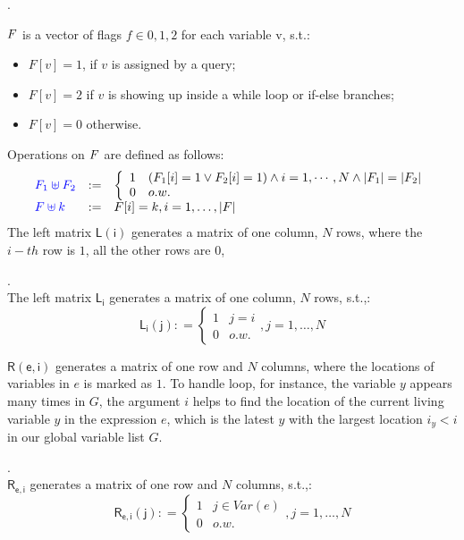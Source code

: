 \documentclass[a4paper,11pt]{article}
\begin{document}
\begin{defn}.
\\
{
$F$ is a vector of flags $f \in {0, 1, 2}$ for each variable v, s.t.:
\begin{itemize}
\item $F[v] = 1$, if $v$ is assigned by a query; 
\item $F[v] = 2$ if $v$ is showing up inside a while loop or if-else branches;
\item $F[v] = 0$ otherwise.
\end{itemize}
} 
\end{defn}
%
Operations on $F$ are defined as follows:
\[
\begin{array}{lll}
\jl{\flag_1 \uplus \flag_2} & := &
\left\{
\begin{array}{ll}
1 & (\flag_1[i] = 1 \lor \flag_2[i] = 1) \land i = 1, \cdots, N \land |\flag_1| = |\flag_2|\\
0 & o.w.
\end{array}\right.
\\
\jl{\flag \uplus k} & := & \flag[i] = k , i = 1, \ldots, |\flag|    \\
\end{array}
\]
The left matrix $\mathsf{L(i)}$ generates a matrix of one column, $N$ rows, where the $i-th$ row is $1$, all the other rows are $0$,
\begin{defn}.
\\
The left matrix $\mathsf{L_i}$ generates a matrix of one column, $N$ rows, s.t.,:
\[
	\mathsf{L_i(j)} : = 
	\left\{
	\begin{array}{ll}
	1 & j = i \\
	0 & o.w.
	\end{array}
	\right., j = 1, \ldots, N
\]
\end{defn}

$\mathsf{R(e, i)}$ generates a matrix of one row and $N$ columns, where the locations of variables in $e$ is marked as $1$. To handle loop, for instance, the variable $y$ appears many times in $G$, the argument $i$ helps to find the location of the current living variable $y$ in the expression $e$, which is the latest $y$ with the largest location $i_y< i$ in our global variable list $G$.
\begin{defn}.
\\
$\mathsf{R_{e, i}}$ generates a matrix of one row and $N$ columns, s.t.,:
\[
	\mathsf{R_{e, i}(j)} : = 
	\left\{
	\begin{array}{ll}
	1 & j \in Var(e) \\
	0 & o.w.
	\end{array}
	\right., j = 1, \ldots, N
\]
\end{defn}
\end{document}
